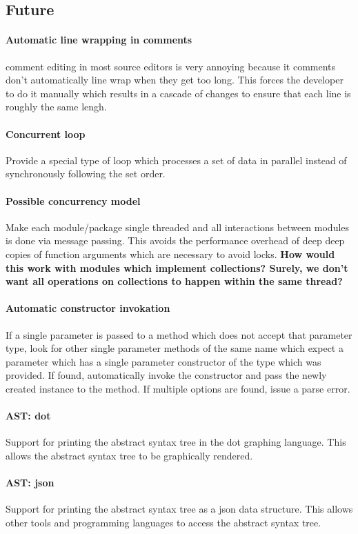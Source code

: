 \documentclass[hidelinks]{article}
\begin{document}
\subsection{Future}
\paragraph{Automatic line wrapping in comments} comment editing in most source editors is very annoying because it comments don't automatically line wrap when they get too long. This forces the developer to do it manually which results in a cascade of changes to ensure that each line is roughly the same lengh.
\paragraph{Concurrent loop} Provide a special type of loop which processes a set of data in parallel instead of synchronously following the set order.
\paragraph{Possible concurrency model} Make each module/package single threaded and all interactions between modules is done via message passing. This avoids the performance overhead of deep deep copies of function arguments which are necessary to avoid locks. \textbf{How would this work with modules which implement collections? Surely, we don't want all operations on collections to happen within the same thread?}
\paragraph{Automatic constructor invokation} If a single parameter is passed to a method which does not accept that parameter type, look for other single parameter methods of the same name which expect a parameter which has a single parameter constructor of the type which was provided. If found, automatically invoke the constructor and pass the newly created instance to the method. If multiple options are found, issue a parse error.
\paragraph{AST: dot} Support for printing the abstract syntax tree in the dot graphing language. This allows the abstract syntax tree to be graphically rendered.
\paragraph{AST: json} Support for printing the abstract syntax tree as a json data structure. This allows other tools and programming languages to access the abstract syntax tree.
\end{document}
